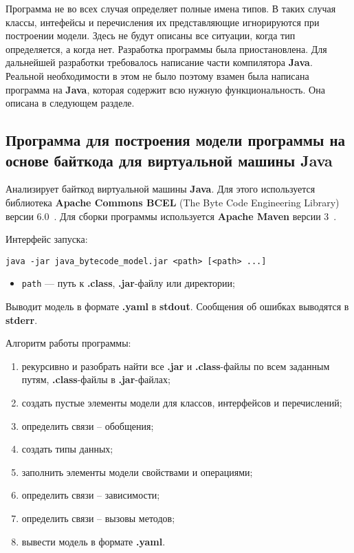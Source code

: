 Программа не во всех случая определяет полные имена типов.
В таких случая классы, интефейсы и перечисления их представляющие игнорируются
при построении модели.
Здесь не будут описаны все ситуации, когда тип определяется, а когда нет.
Разработка программы была приостановлена.
Для дальнейшей разработки требовалось написание части компилятора \textbf{Java}.
Реальной необходимости в этом не было
поэтому взамен была написана программа на \textbf{Java},
которая содержит всю нужную функциональность.
Она описана в следующем разделе.

\subsection{Программа для построения модели программы на основе байткода для виртуальной машины Java}

Анализирует байткод виртуальной машины \textbf{Java}.
Для этого используется библиотека \textbf{Apache Commons BCEL}
(The Byte Code Engineering Library) версии 6.0~\cite{BCEL}.
Для сборки программы используется \textbf{Apache Maven} версии 3~\cite{Maven}.

Интерфейс запуска:
\begin{verbatim}
java -jar java_bytecode_model.jar <path> [<path> ...]
\end{verbatim}

\begin{itemize}
\item \verb;path; --- путь к \textbf{.class}, \textbf{.jar}-файлу или директории;
\end{itemize}

Выводит модель в формате \textbf{.yaml} в \textbf{stdout}.
Сообщения об ошибках выводятся в \textbf{stderr}.

Алгоритм работы программы:
\begin{enumerate}
\item рекурсивно и разобрать найти все \textbf{.jar} и \textbf{.class}-файлы по
всем заданным путям, \textbf{.class}-файлы в \textbf{.jar}-файлах;
\item создать пустые элементы модели для классов, интерфейсов и перечислений;
\item определить связи -- обобщения;
\item создать типы данных;
\item заполнить элементы модели свойствами и операциями;
\item определить связи -- зависимости;
\item определить связи -- вызовы методов;
\item вывести модель в формате \textbf{.yaml}.
\end{enumerate}

